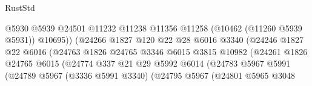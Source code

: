 \begin{lexlean}{RustStd}
\begin{coremodule}
                                            @5930
                                            @5939
                                            @24501
                                            @11232
                                            @11238
                                            @11356
                                            @11258
                                            (@10462 (@11260 @5939 @5931))
                                            @10695))
                                        (@24266
                                          @1827
                                          @120
                                          @22
                                          @28
                                          @6016
                                          @3340
                                          (@24246
                                            @1827
                                            @22
                                            @6016
                                            (@24763
                                              @1826
                                              @24765
                                              @3346
                                              @6015
                                              @3815
                                              @10982
                                              (@24261
                                                @1826
                                                @24765
                                                @6015
                                                (@24774
                                                  @337
                                                  @21
                                                  @29
                                                  @5992
                                                  @6014
                                                  (@24783
                                                    @5967
                                                    @5991
                                                    (@24789
                                                      @5967
                                                      (@3336 @5991 @3340)
                                                      (@24795
                                                        @5967
                                                        (@24801
                                                          @5965
                                                          @3048

\end{coremodule}
\end{lexlean}
